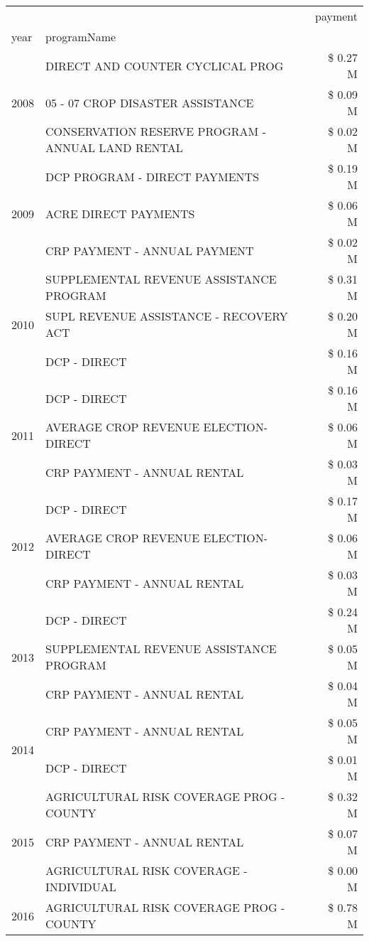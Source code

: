 \begin{tabular}{llr}
\toprule
 &  & payment \\
year & programName &  \\
\midrule
\multirow[t]{3}{*}{2008} & DIRECT AND COUNTER CYCLICAL PROG & \$ 0.27 M \\
 & 05 - 07 CROP DISASTER ASSISTANCE & \$ 0.09 M \\
 & CONSERVATION RESERVE PROGRAM - ANNUAL LAND RENTAL & \$ 0.02 M \\
\cline{1-3}
\multirow[t]{3}{*}{2009} & DCP PROGRAM - DIRECT PAYMENTS & \$ 0.19 M \\
 & ACRE DIRECT PAYMENTS & \$ 0.06 M \\
 & CRP PAYMENT - ANNUAL PAYMENT & \$ 0.02 M \\
\cline{1-3}
\multirow[t]{3}{*}{2010} & SUPPLEMENTAL REVENUE ASSISTANCE PROGRAM & \$ 0.31 M \\
 & SUPL REVENUE ASSISTANCE - RECOVERY ACT & \$ 0.20 M \\
 & DCP - DIRECT & \$ 0.16 M \\
\cline{1-3}
\multirow[t]{3}{*}{2011} & DCP - DIRECT & \$ 0.16 M \\
 & AVERAGE CROP REVENUE ELECTION-DIRECT & \$ 0.06 M \\
 & CRP PAYMENT - ANNUAL RENTAL & \$ 0.03 M \\
\cline{1-3}
\multirow[t]{3}{*}{2012} & DCP - DIRECT & \$ 0.17 M \\
 & AVERAGE CROP REVENUE ELECTION-DIRECT & \$ 0.06 M \\
 & CRP PAYMENT - ANNUAL RENTAL & \$ 0.03 M \\
\cline{1-3}
\multirow[t]{3}{*}{2013} & DCP - DIRECT & \$ 0.24 M \\
 & SUPPLEMENTAL REVENUE ASSISTANCE PROGRAM & \$ 0.05 M \\
 & CRP PAYMENT - ANNUAL RENTAL & \$ 0.04 M \\
\cline{1-3}
\multirow[t]{2}{*}{2014} & CRP PAYMENT - ANNUAL RENTAL & \$ 0.05 M \\
 & DCP - DIRECT & \$ 0.01 M \\
\cline{1-3}
\multirow[t]{3}{*}{2015} & AGRICULTURAL RISK COVERAGE PROG - COUNTY & \$ 0.32 M \\
 & CRP PAYMENT - ANNUAL RENTAL & \$ 0.07 M \\
 & AGRICULTURAL RISK COVERAGE - INDIVIDUAL & \$ 0.00 M \\
\cline{1-3}
\multirow[t]{3}{*}{2016} & AGRICULTURAL RISK COVERAGE PROG - COUNTY & \$ 0.78 M \\

\end{tabular}
